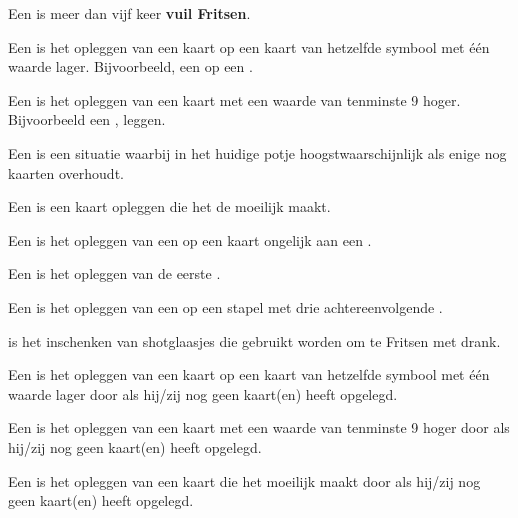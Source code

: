 
\item Een  is meer dan vijf keer \textbf{vuil Fritsen}\footnotemark[2].

\item Een  is het opleggen van een kaart op een kaart van hetzelfde symbool met \'e\'en waarde lager. Bijvoorbeeld, een  op een .

\item Een  is het opleggen van een kaart met een waarde van tenminste 9 hoger. Bijvoorbeeld een ,  leggen.

\item Een  is een situatie waarbij \eenSpeler in het huidige potje hoogstwaarschijnlijk als enige nog kaarten overhoudt.

\item Een  is een kaart opleggen die het de \andereSpelers moeilijk maakt.

\item Een  is het opleggen van een  op een kaart ongelijk aan een .

\item Een  is het opleggen van de eerste .

\item Een  is het opleggen van een  op een stapel met drie achtereenvolgende .

\item {} is het inschenken van shotglaasjes die gebruikt worden om te Fritsen met drank.

\item Een  is het opleggen van een kaart op een kaart van hetzelfde symbool met \'e\'en waarde lager door \Willem als hij/zij nog geen kaart(en) heeft opgelegd.

\item Een  is het opleggen van een kaart met een waarde van tenminste 9 hoger door \Willem als hij/zij nog geen kaart(en) heeft opgelegd.

\item Een  is het opleggen van een kaart die het \andereSpelers moeilijk maakt door \Willem als hij/zij nog geen kaart(en) heeft opgelegd.

